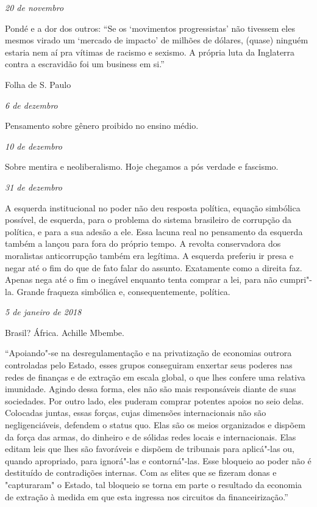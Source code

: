 \begin{flushright}
\emph{20 de novembro}
\end{flushright}

Pondé e a dor dos outros: ``Se os `movimentos progressistas' não
tivessem eles mesmos virado um `mercado de impacto' de milhões de
dólares, (quase) ninguém estaria nem aí pra vítimas de racismo e
sexismo. A própria luta da Inglaterra contra a escravidão foi um
business em si.''

Folha de S. Paulo

\begin{flushright}
\emph{6 de dezembro}
\end{flushright}

Pensamento sobre gênero proibido no ensino médio.

\begin{flushright}
\emph{10 de dezembro}
\end{flushright}

Sobre mentira e neoliberalismo. Hoje chegamos a pós verdade e fascismo.

\begin{flushright}
\emph{31 de dezembro}
\end{flushright}

A esquerda institucional no poder não deu resposta política, equação
simbólica possível, de esquerda, para o problema do sistema brasileiro
de corrupção da política, e para a sua adesão a ele. Essa lacuna real no
pensamento da esquerda também a lançou para fora do próprio tempo. A
revolta conservadora dos moralistas anticorrupção também era legítima. A
esquerda preferiu ir presa e negar até o fim do que de fato falar do
assunto. Exatamente como a direita faz. Apenas nega até o fim o inegável
enquanto tenta comprar a lei, para não cumpri"-la. Grande fraqueza
simbólica e, consequentemente, política.

\begin{flushright}
\emph{5 de janeiro de 2018}
\end{flushright}

Brasil? África. Achille Mbembe.

``Apoiando"-se na desregulamentação e na privatização de economias
outrora controladas pelo Estado, esses grupos conseguiram enxertar seus
poderes nas redes de finanças e de extração em escala global, o que lhes
confere uma relativa imunidade. Agindo dessa forma, eles não são mais
responsáveis diante de suas sociedades. Por outro lado, eles puderam
comprar potentes apoios no seio delas. Colocadas juntas, essas forças,
cujas dimensões internacionais não são negligenciáveis, defendem o
status quo. Elas são os meios organizados e dispõem da força das armas,
do dinheiro e de sólidas redes locais e internacionais. Elas editam leis
que lhes são favoráveis e dispõem de tribunais para aplicá"-las ou,
quando apropriado, para ignorá"-las e contorná"-las. Esse bloqueio ao
poder não é destituído de contradições internas. Com as elites que se
fizeram donas e "capturaram" o Estado, tal bloqueio se torna em parte o
resultado da economia de extração à medida em que esta ingressa nos
circuitos da financeirização.''

